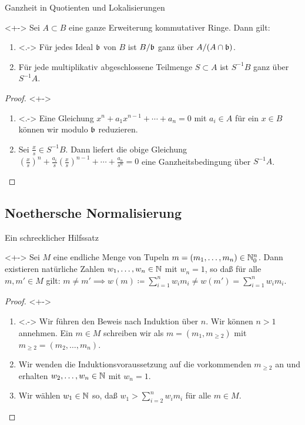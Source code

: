 \begin{frame}{Ganzheit in Quotienten und Lokalisierungen}
	\begin{proposition}<+->
		Sei \(A \subset B\) eine ganze Erweiterung kommutativer Ringe. Dann
		gilt:
		\begin{enumerate}[<+->]
		\item<.->
			Für jedes Ideal \(\mathfrak{b}\) von \(B\) ist \(B/\mathfrak{b}\) ganz über
			\(A/(A \cap \mathfrak{b})\).
		\item
			Für jede multiplikativ abgeschlossene Teilmenge \(S \subset A\) ist
			\(S^{-1} B\) ganz über \(S^{-1} A\).
		\end{enumerate}
	\end{proposition}
	\begin{proof}<+->
		\begin{enumerate}[<+->]
		\item<.->
			Eine Gleichung \(x^n + a_1 x^{n - 1} + \dotsb + a_n = 0\) mit
			\(a_i \in A\) für ein \(x \in B\) können wir modulo \(\mathfrak{b}\)
			reduzieren.
		\item
			Sei \(\frac x s \in S^{-1} B\). Dann liefert die obige Gleichung
			\((\frac x s)^n + \frac{a_i} s (\frac x s)^{n - 1} + \dotsb +
			\frac{a_n} {s^n} = 0\)
			eine Ganzheitsbedingung über \(S^{-1} A\).
			\qedhere
		\end{enumerate}
	\end{proof}
\end{frame}

\subsection{Noethersche Normalisierung}

\begin{frame}{Ein schrecklicher Hilfssatz}
	\begin{lemma}<+->
		Sei \(M\) eine endliche Menge von Tupeln \(m = (m_1, \dotsc, m_n)
		\in \mathbb N_0^n\). Dann existieren natürliche Zahlen \(w_1, \dotsc,
		w_n \in \mathbb N\) mit \(w_n = 1\), so daß für alle
		\(m, m' \in M\) gilt: \(m \neq m' \implies
		w(m) \coloneqq
		\sum\limits_{i = 1}^n w_i m_i \neq
		w(m') = \sum\limits_{i = 1}^n w_i m_i\).
	\end{lemma}
	\begin{proof}<+->
		\begin{enumerate}[<+->]
		\item<.->
			Wir führen den Beweis nach Induktion über \(n\). Wir können
			\(n > 1\) annehmen. Ein \(m \in M\) schreiben wir als
			\(m = (m_1, m_{\ge 2})\) mit \(m_{\ge 2} = (m_2, \dotsc, m_n)\).
		\item
			Wir wenden die Induktionsvoraussetzung auf die vorkommenden
			\(m_{\ge 2}\) an und erhalten \(w_2, \dotsc, w_n \in \mathbb N\) mit
			\(w_n = 1\).
		\item
			Wir wählen \(w_1 \in \mathbb N\) so, daß
			\(w_1 > \sum\limits_{i = 2}^n w_i m_i\) für alle \(m \in M\).
			\qedhere
		\end{enumerate}
	\end{proof}
\end{frame}

